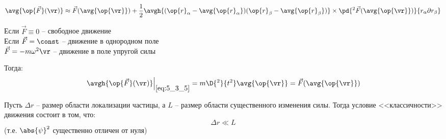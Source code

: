 \begin{equation}
\label{eq:5_3_8}
\avg{\op{\vec{F}}(\vr)} \approx \vec{F}(\avg{\op{\vr}}) + \frac{1}{2} \avgh{(\op{r}_\alpha - \avg{\op{r}_\alpha})(\op{r}_\beta - \avg{\op{r}_\beta})} \times \pd{^2 \vec{F}(\avg{\op{\vr}})}{r_\alpha \partial r_\beta}
\end{equation}

\noindent
Если $\vec{F} \equiv 0$ -- свободное движение\\
Если $\vec{F} = \const$ -- движение в однородном поле\\
$\vec{F} = - m\omega^2 \vr$ -- движение в поле упругой силы

Тогда:
\begin{equation}
\label{eq:5_3_9}
\left. \avgh{\op{\vec{F}}(\vr)} \right|_{\eqref{eq:5_3_5}} = m \D{^2}{t^2} \avg{\op{\vr}} = \vec{F}(\avg{\op{\vr}})
\end{equation}

Пусть $\Delta r$ -- размер области локализации частицы, а $L$ -- размер области существенного изменения силы. Тогда условие <<классичности>> движения состоит в том, что:
\begin{equation}
\label{eq:5_3_10}
\Delta r \ll L
\end{equation}
(т.е. $\abs{\psi}^2$ существенно отличен от нуля)
